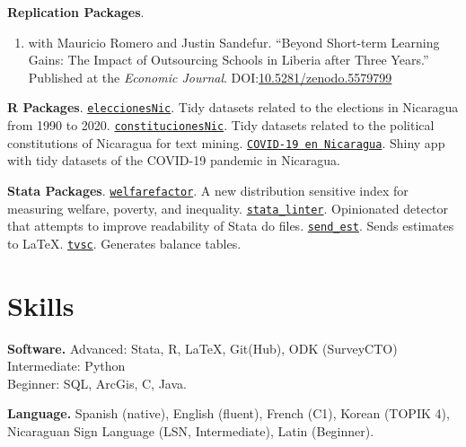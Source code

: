 \documentclass[a4paper, 10pt]{article}
\renewenvironment{itemize}{
  \begin{list}{}
    { \setlength{\itemsep}{5pt}
      \setlength{\parsep}{0pt}
      \setlength{\topsep}{0pt}
      \setlength{\leftmargin}{0em} } }{
  \end{list}}
\begin{document}
\begin{itemize}
  \item \textbf{Replication Packages}.
  \begin{enumerate}[leftmargin=10pt, label={}, itemindent=-10pt, nosep]
    \item with Mauricio Romero and Justin Sandefur. ``Beyond Short-term Learning Gains: The Impact of Outsourcing Schools in Liberia after Three Years.'' Published at the \textit{Economic Journal}. DOI:\href{https://doi.org/10.5281/zenodo.5579799}{10.5281/zenodo.5579799}
  \end{enumerate}
  \item \textbf{R Packages}. \newline \texttt{\href{https://github.com/RRMaximiliano/eleccionesNic}{eleccionesNic}}. Tidy datasets related to the elections in Nicaragua from 1990 to 2020. \newline \texttt{\href{https://github.com/RRMaximiliano/constitucionesNic}{constitucionesNic}}. Tidy datasets related to the political constitutions of Nicaragua for text mining. \newline \texttt{\href{https://rrmaximiliano.shinyapps.io/covid-nicaragua/}{COVID-19 en Nicaragua}}. Shiny app with tidy datasets of the COVID-19 pandemic in Nicaragua.
  \item \textbf{Stata Packages}. \newline
  \texttt{\href{https://github.com/RRMaximiliano/welfarefactor}{welfarefactor}}.
  A new distribution sensitive index for measuring welfare, poverty, and
  inequality.
  \newline \texttt{\href{https://github.com/worldbank/stata-linter}
  {stata\_linter}}. Opinionated detector that attempts to improve readability of Stata do files. \newline \texttt{\href{https://github.com/RRMaximiliano/send\_est}{send\_est}}. Sends estimates to \LaTeX. \newline \texttt{\href{https://github.com/RRMaximiliano/tvsc}{tvsc}}. Generates balance tables.
\end{itemize}


\section*{Skills}
\begin{itemize}
\item \textbf{Software.} \newline Advanced: Stata, R, \LaTeX, Git(Hub), ODK (SurveyCTO) \\
Intermediate: Python \\
Beginner: SQL, ArcGis, C, Java.
\item \textbf{Language.} \newline Spanish (native), English (fluent), French
(C1), Korean (TOPIK 4), Nicaraguan Sign Language (LSN, Intermediate), Latin
(Beginner).
\end{itemize}
\bigskip
\end{document}
